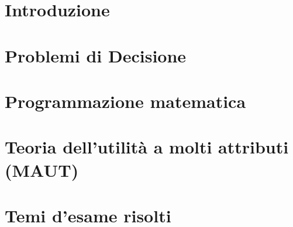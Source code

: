 \providecommand{\main}{.}








{\hypersetup{hidelinks}
  \tableofcontents  %
}

\chapter{Introduzione}


\chapter{Problemi di Decisione}

\chapter{Programmazione matematica}

\chapter{Teoria dell'utilità a molti attributi (MAUT)}


%

\appendix
\chapter{Temi d'esame risolti}




